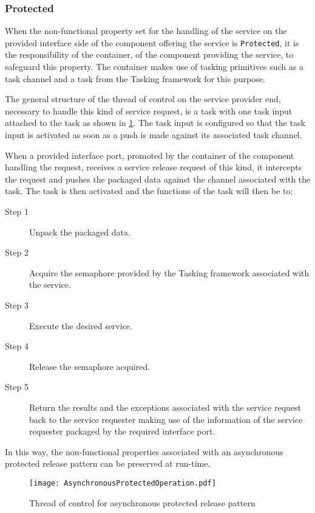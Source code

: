 \subsubsection{\textbf{Protected}}
When the non-functional property set for the handling of the service on the provided interface side of the component offering the service is \texttt{Protected}, it is the responsibility of the container, of the component providing the service, to safeguard this property. The container makes use of tasking primitives such as a task channel and a task from the Tasking framework for this purpose. 

The general structure of the thread of control on the service provider end, necessary to handle this kind of service request, is a task with one task input attached to the task as shown in \cref{fig: Asynchronous protected}. The task input is configured so that the task input is activated as soon as a push is made against its associated task channel.  

When a provided interface port, promoted by the container of the component handling the request, receives a service release request of this kind, it intercepts the request and pushes the packaged data against the channel associated with the task. The task is then activated and the functions of the task will then be to:

\begin{description}
\item [Step 1] Unpack the packaged data.
\item [Step 2] Acquire the semaphore provided by the Tasking framework associated with the service.
\item [Step 3] Execute the desired service.
\item [Step 4] Release the semaphore acquired. 
\item [Step 5] Return the results and the exceptions associated with the service request back to the service requester making use of the information of the service requester packaged by the required interface port. 
\end{description}

In this way, the non-functional properties associated with an asynchronous protected release pattern can be preserved at run-time.

\begin{figure}[h]
	\centering
	\texttt{[image: AsynchronousProtectedOperation.pdf]}
	\caption{Thread of control for asynchronous protected release pattern}
	\label{fig: Asynchronous protected}
\end{figure}

